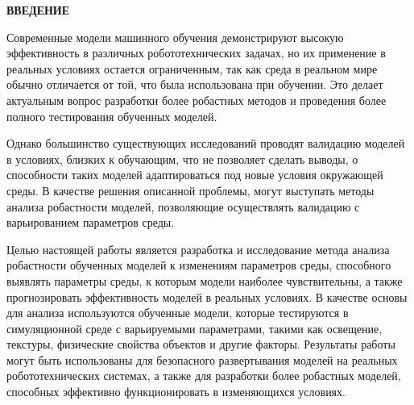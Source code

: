 





\newpage
\renewcommand{\contentsname}{\centerline{\large СОДЕРЖАНИЕ}}
\tableofcontents

\newpage
\begin{center}
  \textbf{\large ВВЕДЕНИЕ}
\end{center}

Современные модели машинного обучения демонстрируют высокую эффективность в различных робототехнических задачах, 
но их применение в реальных условиях остается ограниченным, так как среда в реальном мире обычно отличается от той, 
что была использована при обучении. Это делает актуальным вопрос разработки более робастных методов и проведения более полного тестирования обученных моделей.

Однако большинство существующих исследований проводят валидацию моделей в условиях, близких к обучающим, 
что не позволяет сделать выводы, о способности таких моделей адаптироваться под новые условия окружающей среды. 
В качестве решения описанной проблемы, могут выступать методы анализа робастности моделей, позволяющие осуществлять валидацию с варьированием параметров среды.

Целью настоящей работы является разработка и исследование метода анализа робастности обученных моделей к изменениям параметров среды, 
способного выявлять параметры среды, к которым модели наиболее чувствительны, а также прогнозировать эффективность моделей в реальных условиях. В качестве основы для анализа используются обученные модели, 
которые тестируются в симуляционной среде с варьируемыми параметрами, такими как освещение, текстуры, физические свойства объектов и другие факторы.
Результаты работы могут быть использованы для безопасного развертывания моделей на реальных робототехнических системах, а также для разработки более робастных моделей, способных эффективно функционировать в изменяющихся условиях.
